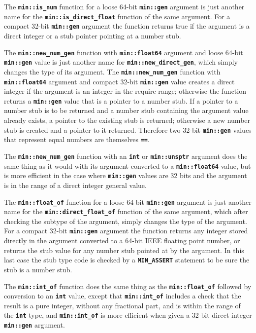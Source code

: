 \documentclass[12pt]{article}
\newcommand{\TT}[1]{{\tt \bfseries #1}}
\newcommand{\EOL}{\penalty \exhyphenpenalty}
\begin{document}
The \TT{min::is\_num} function for a loose 64-bit \TT{min::gen} argument
is just another name for the \TT{min::is\_direct\_float} function of the same
argument.  For a compact 32-bit \TT{min::gen} argument the function returns
true if the argument is a direct integer or a stub pointer
pointing at a number stub.

The \TT{min::new\_num\_gen} function with \TT{min::float64} argument
and loose 64-bit \TT{min::gen} value
is just another name for \TT{min::new\_\EOL direct\_\EOL gen}, which
simply changes the type of its argument.
The \TT{min::new\_num\_gen} function with \TT{min::float64} argument
and compact 32-bit \TT{min::gen} value creates a direct integer
if the argument is an integer in the
require range; otherwise the function returns a \TT{min::gen} value
that is a pointer to a number stub.  If a pointer to a number stub is
to be returned and a number stub containing the argument value already exists,
a pointer to the existing stub is returned;
otherwise a new number stub is created and a pointer to it returned.
Therefore two 32-bit \TT{min::gen} values that represent equal numbers are
themselves \TT{==}.

The \TT{min::new\_num\_gen} function with an \TT{int} or \TT{min::unsptr}
argument does the
same thing as it would with its argument converted to a \TT{min::float64}
value, but is more efficient in the case where \TT{min::gen} values
are 32 bits and the argument is in the range of a direct integer general
value.

The \TT{min::float\_of} function for a loose 64-bit \TT{min::gen}
argument is just another name for the \TT{min::direct\_float\_of} function
of the same argument, which after checking the subtype of the argument,
simply changes the type of the argument.
For a compact 32-bit \TT{min::gen} argument the
function returns any integer stored directly
in the argument converted to a 64-bit IEEE floating point number, or
returns the stub value for any number stub pointed at by the argument.
In this last case the stub type code is checked by a \TT{MIN\_ASSERT}
statement to be sure the stub is a number stub.

The \TT{min::int\_of} function does the same thing as the
\TT{min::float\_of} followed by conversion to an \TT{int} value,
except that \TT{min::int\_of} includes a check that the result
is a pure integer, without any fractional part, and is within the
range of the \TT{int} type, and
\TT{min::int\_of} is more efficient when given a 32-bit direct integer
\TT{min::gen} argument.
\end{document}
